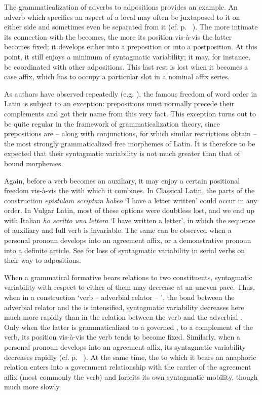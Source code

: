 The grammaticalization of adverbs to adpositions provides an example. An adverb which specifies an aspect of a local \np may often be juxtaposed to it on either side and sometimes even be separated from it (cf. p.~\pageref{page96}\chk%
). The more intimate its connection with the \np becomes, the more its position vis-à-vis the latter becomes fixed; it develops either into a preposition or into a postposition. At this point, it still enjoys a minimum of syntagmatic variability; it may, for instance, be coordinated with other adpositions. This last rest is lost when it becomes a case affix, which has to occupy a particular slot in a nominal affix series.

As authors have observed repeatedly (e.g. \citealt[256]{Matthews1981}), the famous freedom of word order in Latin is subject to an exception: prepositions must normally precede their complements and got their name from this very fact. This exception turns out to be quite regular in the framework of grammaticalization theory, since prepositions are -- along with conjunctions, for which similar restrictions obtain -- the most strongly grammaticalized free morphemes of Latin. It is therefore to be expected that their syntagmatic variability is not much greater than that of bound morphemes.

Again, before a verb becomes an auxiliary, it may enjoy a certain positional freedom vis-à-vis the \vp with which it combines. In Classical Latin, the parts of the construction \textit{epistulam scriptam habeo} ‘I have a letter written’ could occur in any order. In Vulgar Latin, most of these options were doubtless lost, and we end up with Italian \textit{ho scritto una lettera} ‘I have written a letter’, in which the sequence of auxiliary and full verb is invariable. The same can be observed when a personal pronoun develops into an agreement affix, or a demonstrative pronoun into a definite article. See \citet[84f]{Givón1975} for loss of syntagmatic variability in serial verbs on their way to adpositions.

When a grammatical formative bears relations to two constituents, syntagmatic variability with respect to either of them may decrease at an uneven pace. Thus, when in a construction ‘verb -- adverbial relator -- \np’, the bond between the adverbial relator and the \np is intensified, syntagmatic variability decreases here much more rapidly than in the relation between the verb and the adverbial \np. Only when the latter is grammaticalized to a governed \np, to a complement of the verb, its position vis-à-vis the verb tends to become fixed. Similarly, when a personal pronoun develops into an agreement affix, its syntagmatic variability decreases rapidly (cf. p.~\pageref{page44b}\chk%
). At the same time, the \np to which it bears an anaphoric relation enters into a government relationship with the carrier of the agreement affix (most commonly the verb) and forfeits its own syntagmatic mobility, though much more slowly.

